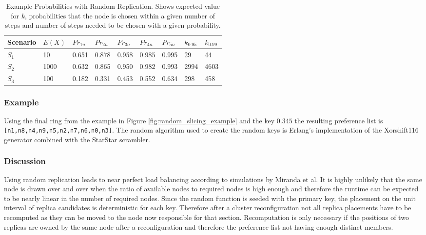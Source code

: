 \begin{table}
\begin{tabularx}{\textwidth}{|l|X|X|X|X|X|X|X|X|}
\hline
Scenario & $E(X)$ & $Pr_{1n}$ & $Pr_{2n}$ & $Pr_{3n}$ & $Pr_{4n}$ & $Pr_{5n}$ & $k_{0.95}$ & $k_{0.99}$\\\hline
$S_1$ & 10 & 0.651 & 0.878 & 0.958 & 0.985 & 0.995 & 29 & 44\\
$S_2$ & 1000 & 0.632 & 0.865 & 0.950 & 0.982 & 0.993 & 2994 & 4603\\
$S_3$ & 100 & 0.182 & 0.331 & 0.453 & 0.552 & 0.634 & 298 & 458\\
\hline
\end{tabularx}
\caption[Example Probabilities with Random Replication]{Example Probabilities with Random Replication. Shows expected value for $k$, probabilities that the node is chosen within a given number of steps and number of steps needed to be chosen with a given probability.}
\label{tab:probabilities}
\end{table}


\subsubsection{Example}
Using the final ring from the example in Figure \ref{fig:random_slicing_example} and the key $0.345$ the resulting preference list is \lstinline![n1,n8,n4,n9,n5,n2,n7,n6,n0,n3]!.
The random algorithm used to create the random keys is Erlang's implementation of the Xorshift116 generator combined with the StarStar scrambler\cite{Blackman2018}.

\subsubsection{Discussion}
Using random replication leads to near perfect load balancing according to simulations by Miranda et al\cite{Miranda2014}.
It is highly unlikely that the same node is drawn over and over when the ratio of available nodes to required nodes is high enough and therefore the runtime can be expected to be nearly linear in the number of required nodes.
Since the random function is seeded with the primary key, the placement on the unit interval of replica candidates is deterministic for each key.
Therefore after a cluster reconfiguration not all replica placements have to be recomputed as they can be moved to the node now responsible for that section.
Recomputation is only necessary if the positions of two replicas are owned by the same node after a reconfiguration and therefore the preference list not having enough distinct members.

